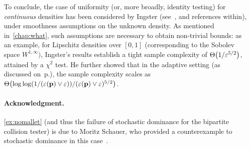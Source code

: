 To conclude, the case of uniformity (or, more broadly, identity testing) for \emph{continuous} densities has been considered by Ingster (see~\citet{Ingster97}, and references within), under smoothness assumptions on the unknown density. As mentioned in~\cref{chap:what}, such assumptions are necessary to obtain non-trivial bounds: as an example, for Lipschitz densities over $[0,1]$ (corresponding to the Sobolev space $W^{1,\infty})$, Ingster's results establish a tight sample complexity of $\bigTheta{1/\dst^{5/2}}$, attained by a $\chi^2$ test. He further showed that in the adaptive setting (as discussed on~p.\pageref{chap:what:adaptive}), the sample complexity scales as $\bigTheta{\log\log(1/(\dst(\p)\lor \dst))/(\dst(\p)\lor \dst)^{5/2}}$.

\paragraph{Acknowledgment.} \cref{ex:nomallet} (and thus the failure of stochastic dominance for the bipartite collision tester) is due to Moritz Schauer, who provided a counterexample to stochastic dominance in this case~\citep{MathSE-schauer}.

